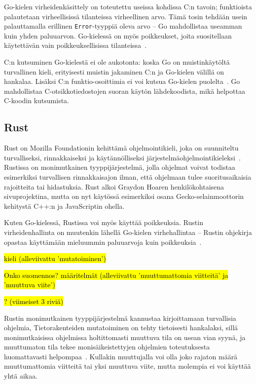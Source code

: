 Go-kielen virheidenkäsittely on toteutettu useissa kohdissa C:n tavoin;
funktioista palautetaan virheellisissä tilanteissa virheellinen arvo. Tämä
tosin tehdään usein palauttamalla erillinen \texttt{Error}-tyyppiä oleva arvo
-- Go mahdollistaa useamman kuin yhden paluuarvon. Go-kielessä on myös
poikkeukset, joita suositellaan käytettävän vain poikkeuksellisissa
tilanteissa~\citep{effectivego}.

C:n kutsuminen Go-kielestä ei ole aukotonta: koska Go on muistinkäytöltä
turvallinen kieli, erityisesti muistin jakaminen C:n ja Go-kielen välillä on
hankalaa. Lisäksi C:n funktio-osoittimia ei voi kutsua Go-kielen
puolelta~\citep{cgo}. Go mahdollistaa C-otsikkotiedostojen suoran käytön
lähdekoodista, mikä helpottaa C-koodin kutsumista.

\subsection{Rust}

Rust on Mozilla Foundationin kehittämä ohjelmointikieli, joka on suunniteltu
turvalliseksi, rinnakkaiseksi ja käytännölliseksi
järjestelmäohjelmointikieleksi~\citep{rustfaq}. Rustissa on monimutkainen
tyyppijärjestelmä, jolla ohjelmat voivat todistaa esimerkiksi turvallisen
rinnakkaisajon ilman, että ohjelmaan tulee suoritusaikaisia rajoitteita tai
hidastuksia. Rust alkoi Graydon Hoaren henkilökohtaisena sivuprojektina, mutta
on nyt käytössä esimerkiksi osana Gecko-selainmoottorin kehitystä C++:n ja
JavaScriptin ohella.

Kuten Go-kielessä, Rustissa voi myös käyttää poikkeuksia. Rustin
virheidenhallinta on muutenkin lähellä Go-kielen virhehallintaa -- Rustin
ohjekirja opastaa käyttämään mieluummin paluuarvoja kuin
poikkeuksia~\citep{rusterrorhandling}.

\hl{kieli (alleviivattu 'mutatoiminen')}

\hl{Onko suomennos? määritelmät (alleviivattu 'muuttumattomia viitteitä' ja 'muuttuva viite')}

\hl {? (viimeiset 3 riviä)}

Rustin monimutkainen tyyppijärjestelmä kannustaa kirjoittamaan turvallisia
ohjelmia, Tietorakenteiden mutatoiminen on tehty tietoisesti hankalaksi, sillä
monimutkaisissa ohjelmissa holtittomasti muuttuva tila on usean vian syynä, ja
muuttumaton tila tekee monisäikeistettyjen ohjelmien
toteutuksesta huomattavasti helpompaa~\citep[luku 4, kohta 17]{effectivejava}.
Kullakin muuttujalla voi olla joko rajaton määrä muuttumattomia
viitteitä tai yksi muuttuva viite, mutta molempia ei voi käyttää yhtä aikaa.

